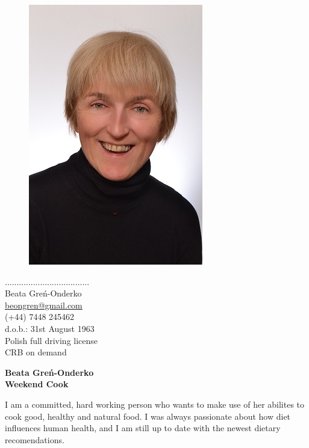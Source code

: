 \documentclass[a4paper,12pt,final]{memoir}
\newcommand{\Sep}{\vspace{1.5em}}
\newenvironment{Career Profile}
	{\ignorespaces\textbf{\color{ForestGreen} Career Profile}}
	{\Sep\ignorespacesafterend}
\newenvironment{Key experience}
	{\ignorespaces\textbf{\color{ForestGreen} Key experience}}
	{\Sep\ignorespacesafterend}
\begin{document}
%
\begin{figure}
	\hfill
	\includegraphics{zeby.JPG}
%
	\vspace{-7cm}
\end{figure}

\begin{flushright}
	\small
	\color{White}....................................\\
	\Sep
	\color{Black}
	Beata Greń-Onderko \\
	\url{beongren@gmail.com}  \\
	(+44) 7448 245462\\
	d.o.b.: 31st August 1963\\
	Polish full driving license\\
	CRB on demand
\end{flushright}\normalsize
\framebreak


\Huge\bfseries {\color{ForestGreen} Beata Greń-Onderko} \\
\Large\bfseries  Weekend Cook \\

\normalsize\normalfont

\begin{Career Profile} 
I am a committed, hard working person who wants to make use of her abilites to cook good, healthy and natural food. I was always passionate about how diet influences human health, and I am still up to date with the newest dietary recomendations. 

\end{Career Profile}
\end{document}
